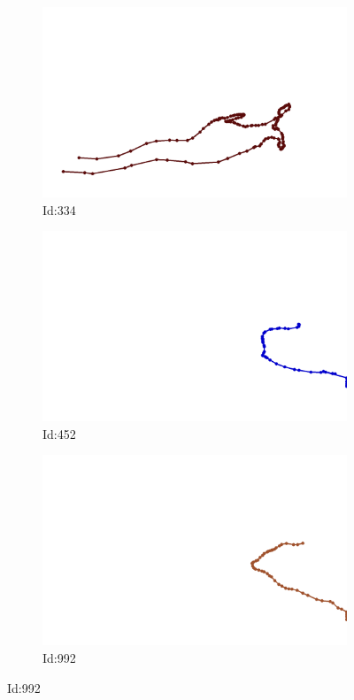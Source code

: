 \documentclass[12pt,twoside]{report}
\begin{document}
\begin{figure}
\centering
\begin{subfigure}[b]{0.20\textwidth}
\centering
\includegraphics[width=\textwidth]{../../trajectories/334.png}
\caption{Id:334}
\end{subfigure}
\begin{subfigure}[b]{0.20\textwidth}
\centering
\includegraphics[width=\textwidth]{../../trajectories/452.png}
\caption{Id:452}
\end{subfigure}
\begin{subfigure}[b]{0.20\textwidth}
\centering
\includegraphics[width=\textwidth]{../../trajectories/992.png}
\caption{Id:992}
\end{subfigure}
\end{figure}
\end{document}

